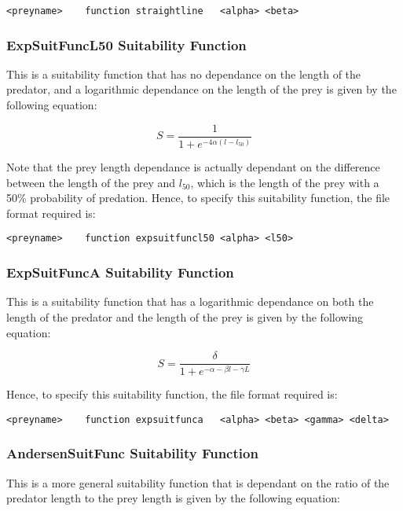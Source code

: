 \documentclass [a4paper, 10pt]{book}
\begin{document}
{\small\begin{verbatim}
<preyname>    function straightline   <alpha> <beta>
\end{verbatim}}

\subsubsection{ExpSuitFuncL50 Suitability Function}
This is a suitability function that has no dependance on the length of the predator, and a logarithmic dependance on the length of the prey is given by the following equation:

\begin{equation}\label{eq:l50suit}
S = { \frac{1}{1 + e^{ -4 \alpha (l - l_{50})}}}
\end{equation}

\bigskip
Note that the prey length dependance is actually dependant on the difference between the length of the prey and $l_{50}$, which is the length of the prey with a 50\% probability of predation.  Hence, to specify this suitability function, the file format required is:

{\small\begin{verbatim}
<preyname>    function expsuitfuncl50 <alpha> <l50>
\end{verbatim}}

\subsubsection{ExpSuitFuncA Suitability Function}
This is a suitability function that has a logarithmic dependance on both the length of the predator and the length of the prey is given by the following equation:

\begin{equation}\label{eq:expsuit}
S = { \frac{\delta}{1 + e^{- \alpha - \beta l - \gamma  L}}}
\end{equation}

\bigskip
Hence, to specify this suitability function, the file format required is:

{\small\begin{verbatim}
<preyname>    function expsuitfunca   <alpha> <beta> <gamma> <delta>
\end{verbatim}}

\subsubsection{AndersenSuitFunc Suitability Function}
This is a more general suitability function that is dependant on the ratio of the predator length to the prey length is given by the following equation:
\end{document}
